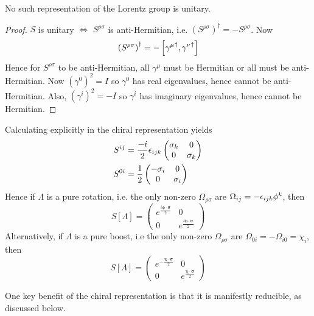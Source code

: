 \documentclass{article}
\begin{document}
\begin{theorem}
No such representation of the Lorentz group is unitary.
\end{theorem}
\begin{proof}
$S$ is unitary $\iff$ $S^{\rho\sigma}$ is anti-Hermitian, i.e. $\left( S^{\rho\sigma} \right)^\dagger = -S^{\rho\sigma}$. Now 
\[
\left( S^{\rho\sigma} \right)^\dagger = -\comm[{\gamma^\mu}^\dagger]{{\gamma^\nu}^\dagger}
\]
Hence for $S^{\rho\sigma}$ to be anti-Hermitian, all $\gamma^\mu$ must be Hermitian or all must be anti-Hermitian. Now $(\gamma^0)^2=I$ so $\gamma^0$ has real eigenvalues, hence cannot be anti-Hermitian. Also, $(\gamma^i)^2=-I$ so $\gamma^i$ has imaginary eigenvalues, hence cannot be Hermitian. 
\end{proof}

\begin{example}
Calculating explicitly in the chiral representation yields 
\begin{align*}
    S^{ij} &= \frac{-i}{2}\eps_{ijk} \begin{pmatrix} \sigma_k & 0 \\ 0 & \sigma_k \end{pmatrix} \\
    S^{0i} &= \frac{1}{2} \begin{pmatrix} -\sigma_i & 0 \\ 0 & \sigma_i \end{pmatrix}
\end{align*}
Hence if $\Lambda$ is a pure rotation, i.e. the only non-zero $\Omega_{\rho\sigma}$ are $\Omega_{ij}=-\eps_{ijk}\phi^k$, then 
\[
S[\Lambda]=\begin{pmatrix} e^{\frac{i\bm{\phi}\cdot\bm{\sigma}}{2}} & 0 \\ 0 & e^{\frac{i\bm{\phi}\cdot\bm{\sigma}}{2}} \end{pmatrix}
\]
Alternatively, if $\Lambda$ is a pure boost, i.e the only non-zero $\Omega_{\rho\sigma}$ are $\Omega_{0i}=-\Omega_{i0}=\chi_i$, then
\[
S[\Lambda]=\begin{pmatrix} e^{-\frac{\bm{\chi}\cdot\bm{\sigma}}{2}} & 0 \\ 0 & e^\frac{\bm{\chi}\cdot\bm{\sigma}}{2} \end{pmatrix}
\]
\end{example}

\begin{idea}
One key benefit of the chiral representation is that it is manifestly reducible, as discussed below.
\end{idea}
\end{document}
